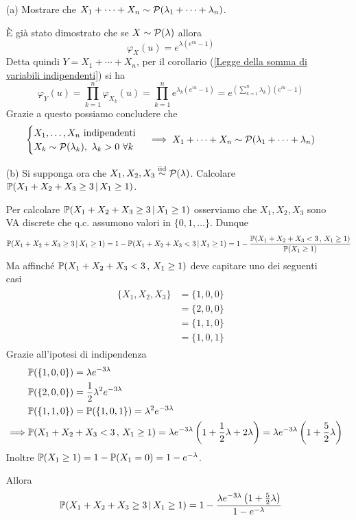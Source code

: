 \Soluzione{} %
\begin{itemize}
\item [(a)] Mostrare che $X_1+\cdots+X_n\sim\mathcal{P}(\lambda_1+\cdots+\lambda_n)$.

È già stato dimostrato che se $X\sim\mathcal{P}(\lambda)$ allora
\[
\varphi_X(u)=e^{\lambda(e^{iu}-1)}
\]
Detta quindi $Y=X_1+\cdots+X_n$, per il corollario (\ref{Legge della somma di variabili indipendenti}) si ha
\[
\varphi_Y(u)=\prod_{k=1}^n\varphi_{X_k}(u)=\prod_{k=1}^n e^{\lambda_k(e^{iu}-1)}=e^{\left(\sum_{k=1}^n \lambda_k  \right)\left(e^{iu}-1   \right)}
\]
Grazie a questo possiamo concludere che 
\[
\begin{cases}X_1,\dots,X_n\text{ indipendenti}\\X_k\sim\mathcal{P}(\lambda_k),\ \lambda_k>0\ \forall k\end{cases} \implies X_1+\cdots+X_n\sim\mathcal{P}(\lambda_1+\cdots+\lambda_n)
\]

\item [(b)] Si supponga ora che $X_1,X_2,X_3\stackrel{\mathrm{iid}}{\sim}\mathcal{P}(\lambda)$. Calcolare $\mathbb{P}(X_1+X_2+X_3\geq 3\,|\,X_1\geq 1)$. 

Per calcolare $\mathbb{P}(X_1+X_2+X_3\geq 3\,|\,X_1\geq 1)$ osserviamo che $X_1,X_2,X_3$ sono VA discrete che q.c. assumono valori in $\{0,1,\dots  \}$. Dunque
\[
\mathbb{P}(X_1+X_2+X_3\geq 3\,|\,X_1\geq 1)=1-\mathbb{P}(X_1+X_2+X_3< 3\, | \,X_1\geq 1)=1-\frac{\mathbb{P}(X_1+X_2+X_3< 3\, , \,X_1\geq 1)}{\mathbb{P}(X_1\geq 1)}
\]
Ma affinché $\mathbb{P}(X_1+X_2+X_3< 3\, , \,X_1\geq 1)$ deve capitare uno dei seguenti casi
\begin{gather*}
\begin{aligned}
\{ X_1,X_2,X_3\}&=\{1,0,0  \} \\
&=\{2,0,0  \} \\
&=\{1,1,0  \} \\
&=\{ 1,0,1 \}
\end{aligned}
\end{gather*}
Grazie all'ipotesi di indipendenza
\begin{gather*}
\begin{aligned}
&\mathbb{P}(\{1,0,0  \})=\lambda e^{-3\lambda} \\
&\mathbb{P}(\{2,0,0  \})=\frac{1}{2}\lambda^2 e^{-3\lambda} \\
&\mathbb{P}(\{1,1,0  \})=\mathbb{P}(\{ 1,0,1 \})=\lambda^2 e^{-3\lambda} \\
\implies & \mathbb{P}(X_1+X_2+X_3< 3\, , \,X_1\geq 1)=\lambda e^{-3\lambda}\left(1+\frac{1}{2}\lambda +2\lambda   \right)=\lambda e^{-3\lambda}\left(1+\frac{5}{2}\lambda  \right)
\end{aligned}
\end{gather*}
Inoltre $\mathbb{P}(X_1\geq 1)=1-\mathbb{P}(X_1=0)=1-e^{-\lambda}$.

Allora
\[
\mathbb{P}(X_1+X_2+X_3\geq 3\,|\,X_1\geq 1)=1-\frac{\lambda e^{-3\lambda}\left(1+\frac{5}{2}\lambda\right)}{1-e^{-\lambda}}
\]

\end{itemize}

